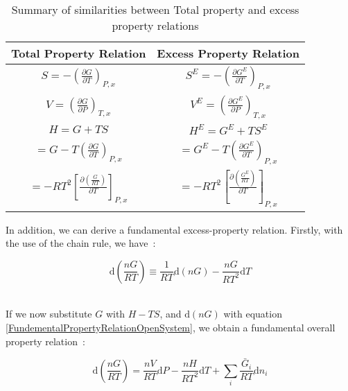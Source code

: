 \begin{table}
			\caption{Summary of similarities between Total property and excess property relations}\label{ExcessPropertyTable}
			\begin{center}
			\begin{tabular}{cc}
			\toprule
			\textbf{Total Property Relation}&\textbf{Excess Property Relation}\\
			\midrule
			\multicolumn{1}{c}{$ S = -\left(\frac{\partial G}{\partial T}\right)_{P,x} $}&\multicolumn{1}{c}{$ S^{E} = -\left(\frac{\partial G^{E}}{\partial T}\right)_{P,x} $}\\
			\multicolumn{1}{c}{$V = \left(\frac{\partial G}{\partial P}\right)_{T,x} $}&\multicolumn{1}{c}{$V^{E} = \left(\frac{\partial G^{E}}{\partial P}\right)_{T,x} $}\\
			\multicolumn{1}{c}{$H  = G + TS$}&\multicolumn{1}{c}{$H^{E}  = G^{E} + TS^{E}$}\\
			\multicolumn{1}{c}{$ = G - T\left(\frac{\partial G}{\partial T}\right)_{P,x}$}&\multicolumn{1}{c}{$ = G^{E} - T\left(\frac{\partial G^{E}}{\partial T}\right)_{P,x}$}\\
			\multicolumn{1}{c}{$ = -RT^{2}\left[ \frac{\partial\left(\frac{G}{RT}\right)}{\partial T}\right]_{P,x}$}&\multicolumn{1}{c}{$ = -RT^{2}\left[ \frac{\partial\left(\frac{G^{E}}{RT}\right)}{\partial T}\right]_{P,x}$}\\
			\bottomrule
			\end{tabular}
			\end{center}
\end{table}
			
In addition, we can derive a fundamental excess-property relation. Firstly, with the use of the chain rule, we have~\cite{SmithNessAbbott}:\

\begin{equation}
\mathrm{d}\left(\frac{nG}{RT}\right) \equiv \frac{1}{RT}\mathrm{d}\left(nG\right) - \frac{nG}{RT^{2}} \mathrm{d}T \label{ChainRule}
\end{equation}\

If we now substitute $G$ with $H - TS$, and $\mathrm{d}\left(nG\right)$ with equation \ref{FundementalPropertyRelationOpenSystem}, we obtain a fundamental overall property relation~\cite{SmithNessAbbott}:\

\begin{equation}
\mathrm{d}\left(\frac{nG}{RT}\right) = \frac{nV}{RT}\mathrm{d}P - \frac{nH}{RT^{2}}\mathrm{d}T  + \sum_{i}\frac{\bar{G}_{i}}{RT}\mathrm{d}n_{i} \label{FundementalPropertyRelation}
\end{equation}\

